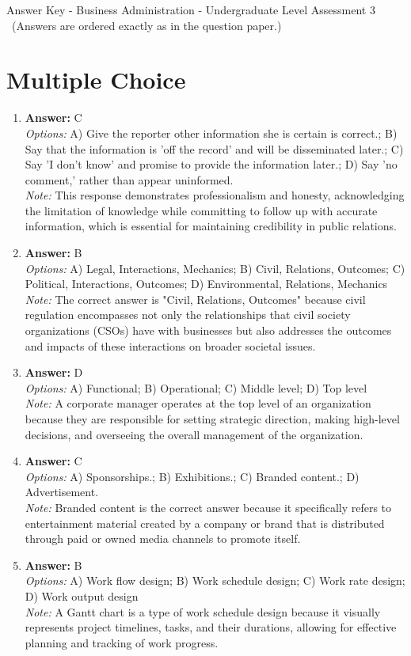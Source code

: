 \documentclass[12pt]{article}
\begin{document}
\begin{center}
Answer Key - Business Administration - Undergraduate Level Assessment 3 \
\small (Answers are ordered exactly as in the question paper.)
\end{center}

\section*{Multiple Choice}
\begin{enumerate}[label=\arabic*.]
\item \textbf{Answer:} C
\\ \textit{Options:} A) Give the reporter other information she is certain is correct.; B) Say that the information is 'off the record' and will be disseminated later.; C) Say 'I don't know' and promise to provide the information later.; D) Say 'no comment,' rather than appear uninformed.
\\ \textit{Note:} This response demonstrates professionalism and honesty, acknowledging the limitation of knowledge while committing to follow up with accurate information, which is essential for maintaining credibility in public relations.
\item \textbf{Answer:} B
\\ \textit{Options:} A) Legal, Interactions, Mechanics; B) Civil, Relations, Outcomes; C) Political, Interactions, Outcomes; D) Environmental, Relations, Mechanics
\\ \textit{Note:} The correct answer is "Civil, Relations, Outcomes" because civil regulation encompasses not only the relationships that civil society organizations (CSOs) have with businesses but also addresses the outcomes and impacts of these interactions on broader societal issues.
\item \textbf{Answer:} D
\\ \textit{Options:} A) Functional; B) Operational; C) Middle level; D) Top level
\\ \textit{Note:} A corporate manager operates at the top level of an organization because they are responsible for setting strategic direction, making high-level decisions, and overseeing the overall management of the organization.
\item \textbf{Answer:} C
\\ \textit{Options:} A) Sponsorships.; B) Exhibitions.; C) Branded content.; D) Advertisement.
\\ \textit{Note:} Branded content is the correct answer because it specifically refers to entertainment material created by a company or brand that is distributed through paid or owned media channels to promote itself.
\item \textbf{Answer:} B
\\ \textit{Options:} A) Work flow design; B) Work schedule design; C) Work rate design; D) Work output design
\\ \textit{Note:} A Gantt chart is a type of work schedule design because it visually represents project timelines, tasks, and their durations, allowing for effective planning and tracking of work progress.
\end{enumerate}
\end{document}
